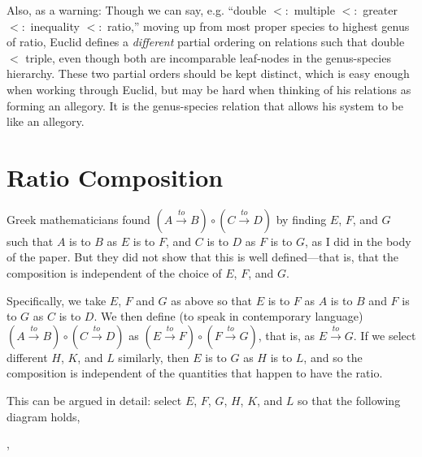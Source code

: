 \documentclass[11pt]{article}
\begin{document}
Also, as a warning: Though we can say, e.g. ``double $<:$ multiple $<:$ greater $<:$ inequality $<:$ ratio,'' moving up from most proper species to highest genus of ratio, Euclid defines a \textit{different} partial ordering on relations such that double $<$ triple, even though both are incomparable leaf-nodes in the genus-species hierarchy. These two partial orders should be kept distinct, which is easy enough when working through Euclid, but may be hard when thinking of his relations as forming an allegory. It is the genus-species relation that allows his system to be like an allegory.

\section{Ratio Composition}\label{CompositionAppendix}

Greek mathematicians found \( \left( A\xrightarrow{to}B\right)\circ \left(C\xrightarrow{to}D\right) \) by finding $E$, $F$, and $G$ such that $A$ is to $B$ as $E$ is to $F$, and $C$ is to $D$ as $F$ is to $G$, as I did in the body of the paper. But they did not show that this is well defined---that is, that the composition is independent of the choice of $E$, $F$, and $G$.

Specifically, we take $E$, $F$ and $G$ as above so that $E$ is to $F$ as $A$ is to $B$ and $F$ is to $G$ as $C$ is to $D$. We then define (to speak in contemporary language) \( \left( A\xrightarrow{to}B\right)\circ \left(C\xrightarrow{to}D\right) \) as \( \left( E\xrightarrow{to}F\right)\circ \left(F\xrightarrow{to}G\right) \), that is, as \(E\xrightarrow{to}G\). If we select different $H$, $K$, and $L$ similarly, then $E$ is to $G$ as $H$ is to $L$, and so the composition is independent of the quantities that happen to have the ratio.

This can be argued in detail: select $E$, $F$, $G$, $H$, $K$, and $L$ so that the following diagram holds, 

\centering%
,
\end{document}
